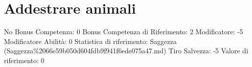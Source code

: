 \section{Addestrare animali}\label{addestrare-animali}

\begin{description}
\tightlist
\item[Tags: ABI]
No Bonus Competenza: 0 Bonus Competenza di Riferimento: 2 Modificatore:
-5 Modificatore Abilità: 0 Statistica di riferimento: Saggezza
(Saggezza\%2066e59b050d604fdb9f941f6ede075a47.md) Tiro Salvezza: -5
Valore di riferimento: 0
\end{description}
